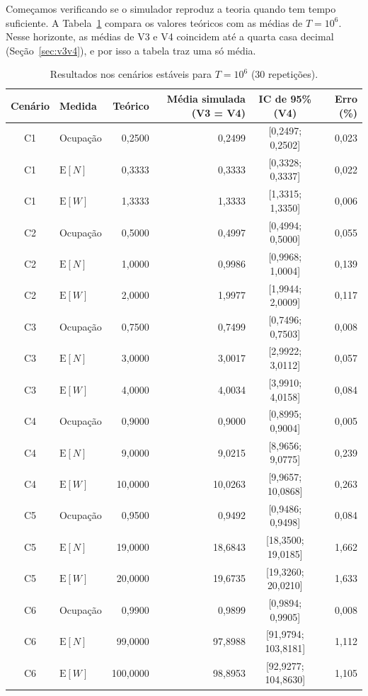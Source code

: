 \documentclass[
  article,      %
  10pt,         %
  oneside,
  a4paper,
  twocolumn,    %
  english,
  brazil        %
]{abntex2}
\newcommand{\EN}{\mathrm{E}[N]}
\newcommand{\EW}{\mathrm{E}[W]}
\begin{document}
Começamos verificando se o simulador reproduz a teoria quando tem tempo suficiente. A Tabela~\ref{tab:resultados-estaveis} compara os valores teóricos com as médias de $T=10^6$. Nesse horizonte, as médias de V3 e V4 coincidem até a quarta casa decimal (Seção~\ref{sec:v3v4}), e por isso a tabela traz uma só média.

\begin{table}[t]
  \centering
  \caption{Resultados nos cenários estáveis para $T=10^6$ (30 repetições).}
  \label{tab:resultados-estaveis}
  \small
  \begin{tabular}{clrrcr}
    \toprule
    Cenário & Medida & Teórico & Média simulada (V3 = V4) & IC de 95\% (V4) & Erro (\%) \\
    \midrule
    C1 & Ocupação & 0,2500 & 0,2499 & [0,2497; 0,2502] & 0,023 \\
    C1 & $\EN$    & 0,3333 & 0,3333 & [0,3328; 0,3337] & 0,022 \\
    C1 & $\EW$    & 1,3333 & 1,3333 & [1,3315; 1,3350] & 0,006 \\
    \midrule
    C2 & Ocupação & 0,5000 & 0,4997 & [0,4994; 0,5000] & 0,055 \\
    C2 & $\EN$    & 1,0000 & 0,9986 & [0,9968; 1,0004] & 0,139 \\
    C2 & $\EW$    & 2,0000 & 1,9977 & [1,9944; 2,0009] & 0,117 \\
    \midrule
    C3 & Ocupação & 0,7500 & 0,7499 & [0,7496; 0,7503] & 0,008 \\
    C3 & $\EN$    & 3,0000 & 3,0017 & [2,9922; 3,0112] & 0,057 \\
    C3 & $\EW$    & 4,0000 & 4,0034 & [3,9910; 4,0158] & 0,084 \\
    \midrule
    C4 & Ocupação & 0,9000 & 0,9000 & [0,8995; 0,9004] & 0,005 \\
    C4 & $\EN$    & 9,0000 & 9,0215 & [8,9656; 9,0775] & 0,239 \\
    C4 & $\EW$    & 10,0000 & 10,0263 & [9,9657; 10,0868] & 0,263 \\
    \midrule
    C5 & Ocupação & 0,9500 & 0,9492 & [0,9486; 0,9498] & 0,084 \\
    C5 & $\EN$    & 19,0000 & 18,6843 & [18,3500; 19,0185] & 1,662 \\
    C5 & $\EW$    & 20,0000 & 19,6735 & [19,3260; 20,0210] & 1,633 \\
    \midrule
    C6 & Ocupação & 0,9900 & 0,9899 & [0,9894; 0,9905] & 0,008 \\
    C6 & $\EN$    & 99,0000 & 97,8988 & [91,9794; 103,8181] & 1,112 \\
    C6 & $\EW$    & 100,0000 & 98,8953 & [92,9277; 104,8630] & 1,105 \\
    \bottomrule
  \end{tabular}
\end{table}
\end{document}
